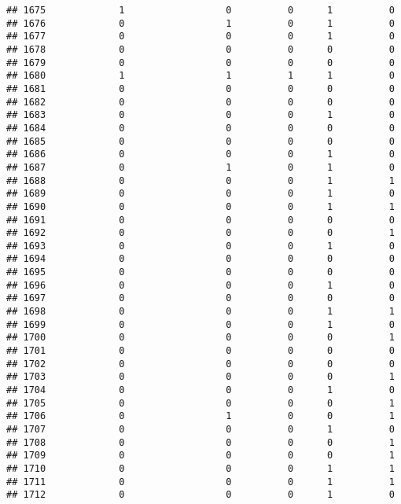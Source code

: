\documentclass[
]{article}
\begin{document}
\begin{verbatim}
## 1675             1                  0          0      1          0
## 1676             0                  1          0      1          0
## 1677             0                  0          0      1          0
## 1678             0                  0          0      0          0
## 1679             0                  0          0      0          0
## 1680             1                  1          1      1          0
## 1681             0                  0          0      0          0
## 1682             0                  0          0      0          0
## 1683             0                  0          0      1          0
## 1684             0                  0          0      0          0
## 1685             0                  0          0      0          0
## 1686             0                  0          0      1          0
## 1687             0                  1          0      1          0
## 1688             0                  0          0      1          1
## 1689             0                  0          0      1          0
## 1690             0                  0          0      1          1
## 1691             0                  0          0      0          0
## 1692             0                  0          0      0          1
## 1693             0                  0          0      1          0
## 1694             0                  0          0      0          0
## 1695             0                  0          0      0          0
## 1696             0                  0          0      1          0
## 1697             0                  0          0      0          0
## 1698             0                  0          0      1          1
## 1699             0                  0          0      1          0
## 1700             0                  0          0      0          1
## 1701             0                  0          0      0          0
## 1702             0                  0          0      0          0
## 1703             0                  0          0      0          1
## 1704             0                  0          0      1          0
## 1705             0                  0          0      0          1
## 1706             0                  1          0      0          1
## 1707             0                  0          0      1          0
## 1708             0                  0          0      0          1
## 1709             0                  0          0      0          1
## 1710             0                  0          0      1          1
## 1711             0                  0          0      1          1
## 1712             0                  0          0      1          0

\end{verbatim}
\end{document}

